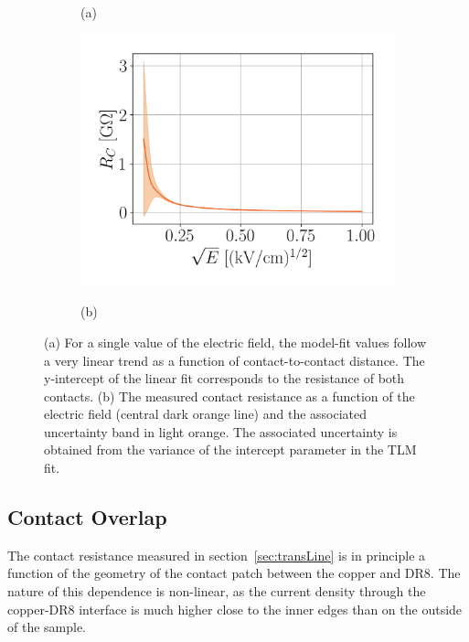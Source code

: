 \documentclass[a4paper,12pt]{article}
\newcommand{\DR}{DR8}
\begin{document}
\begin{figure}[htb]
\begin{subfigure}[c]{0.32\textheight}
\begin{center}
    \vspace*{-\baselineskip} \hspace{1em} (a)
\end{center}
\end{subfigure}
\begin{subfigure}[c]{0.32\textheight}
\begin{center}
    \includegraphics[width=\textwidth]{TLM_length_contactRes.png}

    \vspace*{-\baselineskip} \hspace{2em} (b)
\end{center}
\end{subfigure}
\caption{(a) For a single value of the electric field, the model-fit values follow a very linear trend as a function of contact-to-contact distance.  The y-intercept of the linear fit corresponds to the resistance of both contacts. (b) The measured contact resistance as a function of the electric field (central dark orange line) and the associated uncertainty band in light orange. The associated uncertainty is obtained from the variance of the intercept parameter in the TLM fit.} 
\label{fig:TLM_length_contactRes}
\end{figure}

\subsection{Contact Overlap}
\label{sec:contactOverlap}

The contact resistance measured in section~\ref{sec:transLine} is in principle a function of the geometry of the contact patch between the copper and {\DR}.  The nature of this dependence is non-linear, as the current density through the copper-{\DR} interface is much higher close to the inner edges than on the outside of the sample.
\end{document}
